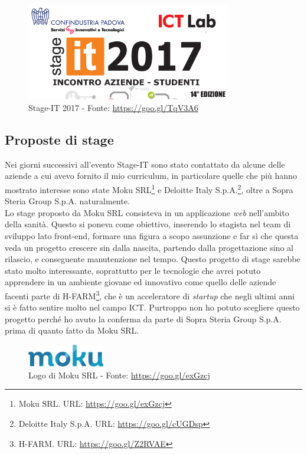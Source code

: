 	\begin{figure}[H]
		\centering
	   	\includegraphics[width=0.8\textwidth]{immagini/StageIT}
	   	\caption{Stage-IT 2017 - Fonte: \url{https://goo.gl/TqV3A6}}
	\end{figure}

\subsection{Proposte di stage}

Nei giorni successivi all'evento Stage-IT sono stato contattato da alcune delle aziende a cui avevo fornito il mio curriculum, in particolare quelle che più hanno mostrato interesse sono state Moku SRL\footnote{Moku SRL. URL: \url{https://goo.gl/exGzcj}} e Deloitte Italy S.p.A.\footnote{Deloitte Italy S.p.A. URL: \url{https://goo.gl/cUGDsp}}, oltre a Sopra Steria Group S.p.A. naturalmente.\\

Lo stage proposto da Moku SRL consisteva in un applicazione \textit{web} nell'ambito della sanità. Questo si poneva come obiettivo, inserendo lo stagista nel team di sviluppo lato front-end\glossario, formare una figura a scopo assunzione e far sì che questa veda un progetto crescere sin dalla nascita, partendo dalla progettazione sino al rilascio, e conseguente manutenzione nel tempo. Questo progetto di stage sarebbe stato molto interessante, soprattutto per le tecnologie che avrei potuto apprendere in un ambiente giovane ed innovativo come quello delle aziende facenti parte di H-FARM\footnote{H-FARM. URL: \url{https://goo.gl/Z2RVAE}}, che è un acceleratore di \textit{startup} che negli ultimi anni si è fatto sentire molto nel campo ICT. Purtroppo non ho potuto scegliere questo progetto perché ho avuto la conferma da parte di Sopra Steria Group S.p.A. prima di quanto fatto da Moku SRL.\\
	\begin{figure}[H]
		\centering
	   	\includegraphics[width=0.3\textwidth]{immagini/moku}
	   	\caption{Logo di Moku SRL - Fonte: \url{https://goo.gl/exGzcj}}
	\end{figure}

